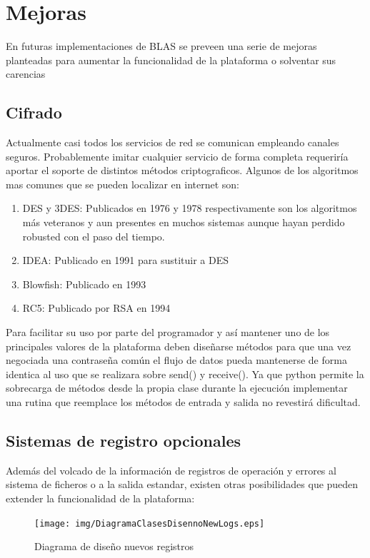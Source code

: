 \documentclass[a4paper,spanish,12pt]{book}
\begin{document}
\section{Mejoras}

En futuras implementaciones de BLAS se preveen una serie de mejoras planteadas para aumentar la funcionalidad de la plataforma o solventar sus carencias

\subsection{Cifrado}
Actualmente casi todos los servicios de red se comunican empleando canales seguros. Probablemente imitar cualquier servicio de forma completa requeriría aportar el soporte de distintos m\'etodos criptograficos. Algunos de los algoritmos mas comunes que se pueden localizar en internet son:
\begin{enumerate}
	\item{DES y 3DES: Publicados en 1976 y 1978 respectivamente son los algoritmos más veteranos y aun presentes en muchos sistemas aunque hayan perdido robusted con el paso del tiempo.}
	\item{IDEA: Publicado en 1991 para sustituir a DES}
	\item{Blowfish: Publicado en 1993}
	\item{RC5: Publicado por RSA en 1994}
\end{enumerate}
Para facilitar su uso por parte del programador y así mantener uno de los principales valores de la plataforma deben diseñarse m\'etodos para que una vez negociada una contraseña común el flujo de datos pueda mantenerse de forma identica al uso que se realizara sobre send() y receive(). Ya que python permite la sobrecarga de m\'etodos desde la propia clase durante la ejecución implementar una rutina que reemplace los m\'etodos de entrada y salida no revestirá dificultad.

\subsection{Sistemas de registro opcionales}
Además del volcado de la información de registros de operación y errores al sistema de ficheros o a la salida estandar, existen otras posibilidades que pueden extender la funcionalidad de la plataforma:
\begin{figure}[h] %
	\texttt{[image: img/DiagramaClasesDisennoNewLogs.eps]}	
              \caption{Diagrama de diseño nuevos registros}
  \label{fig:DiagramaClasesDisennoNewLog}
\end{figure}
\end{document}
